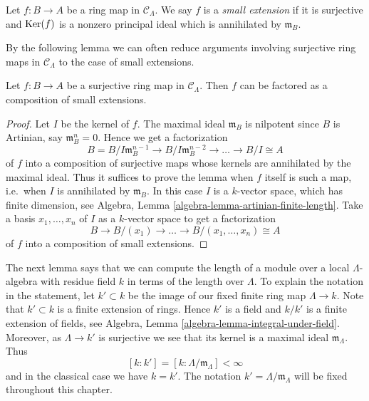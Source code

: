 \begin{definition}
\label{definition-small-extension}
Let $f: B \to A$ be a ring map in $\mathcal{C}_\Lambda$.  We say $f$
is a {\it small extension} if it is surjective and $\mathop{\mathrm{Ker}}(f)$ is a nonzero
principal ideal which is annihilated by $\mathfrak{m}_B$.
\end{definition}

\noindent
By the following lemma we can often reduce arguments involving surjective ring
maps in $\mathcal{C}_\Lambda$ to the case of small extensions.

\begin{lemma}
\label{lemma-factor-small-extension}
Let $f: B \to A$ be a surjective ring map in $\mathcal{C}_\Lambda$.
Then $f$ can be factored as a composition of small extensions.
\end{lemma}

\begin{proof}
Let $I$ be the kernel of $f$.  The maximal ideal $\mathfrak{m}_B$ is
nilpotent since $B$ is Artinian, say $\mathfrak{m}_B^n = 0$. Hence we get a
factorization
$$
B = B/I\mathfrak{m}_B^{n-1} \to B/I\mathfrak{m}_B^{n-2} \to
\ldots \to B/I \cong A
$$
of $f$ into a composition of surjective maps whose kernels are annihilated by
the maximal ideal.  Thus it suffices to prove the lemma when $f$ itself is such
a map, i.e.\ when $I$ is annihilated by $\mathfrak{m}_B$. In this case
$I$ is a $k$-vector space, which has finite dimension, see
Algebra, Lemma \ref{algebra-lemma-artinian-finite-length}.
Take a basis $x_1, \ldots, x_n$ of $I$ as a $k$-vector space to get a
factorization
$$
B \to B/(x_1) \to \ldots \to  B/(x_1, \ldots, x_n) \cong  A
$$
of $f$ into a composition of small extensions.
\end{proof}

\noindent
The next lemma says that we can compute the length of a module over a local
$\Lambda$-algebra with residue field $k$ in terms of the length over
$\Lambda$. To explain the notation in the statement, let $k' \subset k$
be the image of our fixed finite ring map $\Lambda \to k$. Note
that $k' \subset k$ is a finite extension of rings. Hence $k'$ is a field
and $k/k'$ is a finite extension of fields, see
Algebra, Lemma \ref{algebra-lemma-integral-under-field}.
Moreover, as $\Lambda \to k'$ is surjective we see that its kernel
is a maximal ideal $\mathfrak m_\Lambda$. Thus
\begin{equation}
\label{equation-k-prime}
[k : k'] = [k : \Lambda/\mathfrak m_\Lambda] < \infty
\end{equation}
and in the classical case we have $k = k'$. The notation
$k' = \Lambda/\mathfrak m_\Lambda$ will be fixed throughout this chapter.

